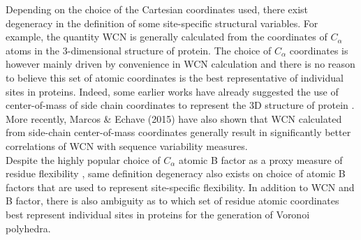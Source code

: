 \documentclass[11pt]{article}
\begin{document}
    Depending on the choice of the Cartesian coordinates used, there exist degeneracy in the definition of some site-specific structural variables. For example, the quantity WCN is generally calculated from the coordinates of $C_\alpha$ atoms in the 3-dimensional structure of protein. The choice of $C_\alpha$ coordinates is however mainly driven by convenience in WCN calculation and there is no reason to believe this set of atomic coordinates is the best representative of individual sites in proteins. Indeed, some earlier works have already suggested the use of center-of-mass of side chain coordinates to represent the 3D structure of protein \cite{soyer_voronoi_2000}. More recently, Marcos \& Echave (2015) \cite{marcos_too_2015} have also shown that WCN calculated from side-chain center-of-mass coordinates generally result in significantly better correlations of WCN with sequence variability measures. \\

    Despite the highly popular choice of $C_\alpha$ atomic B factor as a proxy measure of residue flexibility \cite{halle_flexibility_2002}, same definition degeneracy also exists on choice of atomic B factors that are used to represent site-specific flexibility. In addition to WCN and B factor, there is also ambiguity as to which set of residue atomic coordinates best represent individual sites in proteins for the generation of Voronoi polyhedra. \\
\end{document}
